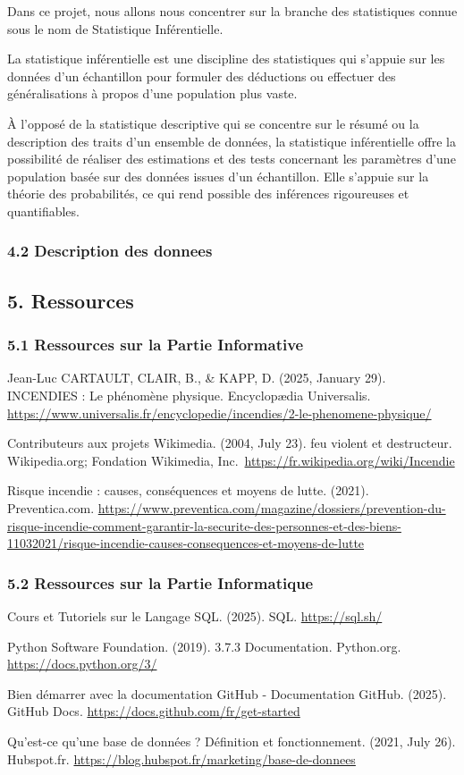 \documentclass[
]{article}
\begin{document}
Dans ce projet, nous allons nous concentrer sur la branche des
statistiques connue sous le nom de Statistique Inférentielle.

La statistique inférentielle est une discipline des statistiques qui
s'appuie sur les données d'un échantillon pour formuler des déductions
ou effectuer des généralisations à propos d'une population plus vaste.

À l'opposé de la statistique descriptive qui se concentre sur le résumé
ou la description des traits d'un ensemble de données, la statistique
inférentielle offre la possibilité de réaliser des estimations et des
tests concernant les paramètres d'une population basée sur des données
issues d'un échantillon. Elle s'appuie sur la théorie des probabilités,
ce qui rend possible des inférences rigoureuses et quantifiables.

\subsubsection{4.2 Description des
donnees}\label{description-des-donnees}

\subsection{5. Ressources}\label{ressources}

\subsubsection{5.1 Ressources sur la Partie
Informative}\label{ressources-sur-la-partie-informative}

Jean-Luc CARTAULT, CLAIR, B., \& KAPP, D. (2025, January 29). INCENDIES
: Le phénomène physique. Encyclopædia Universalis.
\url{https://www.universalis.fr/encyclopedie/incendies/2-le-phenomene-physique/}

Contributeurs aux projets Wikimedia. (2004, July 23). feu violent et
destructeur. Wikipedia.org; Fondation Wikimedia,
Inc.~\url{https://fr.wikipedia.org/wiki/Incendie}

Risque incendie : causes, conséquences et moyens de lutte. (2021).
Preventica.com.
\url{https://www.preventica.com/magazine/dossiers/prevention-du-risque-incendie-comment-garantir-la-securite-des-personnes-et-des-biens-11032021/risque-incendie-causes-consequences-et-moyens-de-lutte}

\subsubsection{5.2 Ressources sur la Partie
Informatique}\label{ressources-sur-la-partie-informatique}

Cours et Tutoriels sur le Langage SQL. (2025). SQL.
\url{https://sql.sh/}

Python Software Foundation. (2019). 3.7.3 Documentation. Python.org.
\url{https://docs.python.org/3/}

Bien démarrer avec la documentation GitHub - Documentation GitHub.
(2025). GitHub Docs. \url{https://docs.github.com/fr/get-started}

Qu'est-ce qu'une base de données ? Définition et fonctionnement. (2021,
July 26). Hubspot.fr.
\url{https://blog.hubspot.fr/marketing/base-de-donnees}
\end{document}
